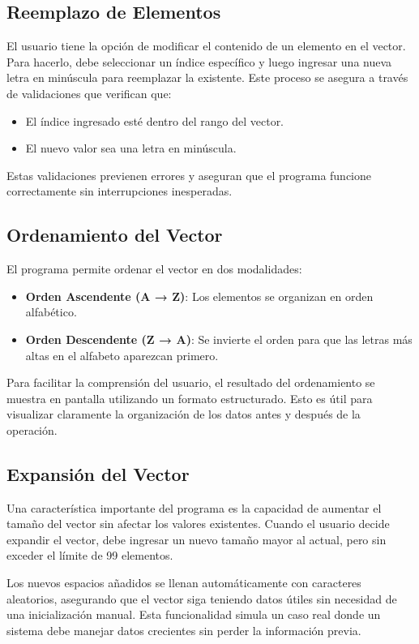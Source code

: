 \documentclass{article}
\begin{document}
\subsection{Reemplazo de Elementos}
El usuario tiene la opción de modificar el contenido de un elemento en el vector. Para hacerlo, debe seleccionar un índice específico y luego ingresar una nueva letra en minúscula para reemplazar la existente. Este proceso se asegura a través de validaciones que verifican que:
\begin{itemize}
    \item El índice ingresado esté dentro del rango del vector.
    \item El nuevo valor sea una letra en minúscula.
\end{itemize}
Estas validaciones previenen errores y aseguran que el programa funcione correctamente sin interrupciones inesperadas.

\subsection{Ordenamiento del Vector}
El programa permite ordenar el vector en dos modalidades:
\begin{itemize}
    \item \textbf{Orden Ascendente (A → Z)}: Los elementos se organizan en orden alfabético.
    \item \textbf{Orden Descendente (Z → A)}: Se invierte el orden para que las letras más altas en el alfabeto aparezcan primero.
\end{itemize}
Para facilitar la comprensión del usuario, el resultado del ordenamiento se muestra en pantalla utilizando un formato estructurado. Esto es útil para visualizar claramente la organización de los datos antes y después de la operación.

\subsection{Expansión del Vector}
Una característica importante del programa es la capacidad de aumentar el tamaño del vector sin afectar los valores existentes. Cuando el usuario decide expandir el vector, debe ingresar un nuevo tamaño mayor al actual, pero sin exceder el límite de 99 elementos.

Los nuevos espacios añadidos se llenan automáticamente con caracteres aleatorios, asegurando que el vector siga teniendo datos útiles sin necesidad de una inicialización manual. Esta funcionalidad simula un caso real donde un sistema debe manejar datos crecientes sin perder la información previa.
\end{document}
